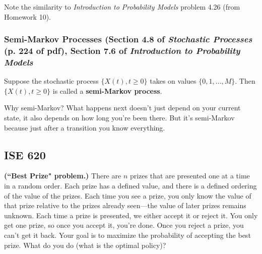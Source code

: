 \begin{example}

Note the similarity to \textit{Introduction to Probability Models} problem 4.26 (from Homework 10).

\end{example}

\subsubsection{Semi-Markov Processes (Section 4.8 of \textit{Stochastic Processes} (p. 224 of pdf), Section 7.6 of \textit{Introduction to Probability Models}}

\begin{definition}Suppose the stochastic process \(\{X(t), t \geq 0\}\) takes on values \(\{0, 1, \ldots, M\}\). Then \(\{X(t), t \geq 0\}\) is called a \textbf{semi-Markov process}. 

\end{definition}

Why semi-Markov? What happens next doesn't just depend on your current state, it also depends on how long you're been there. But it's semi-Markov because just after a transition you know everything.
\subsection{ISE 620}


\begin{exercise} \textbf{(``Best Prize" problem.)} There are \(n\) prizes that are presented one at a time in a random order. Each prize has a defined value, and there is a defined ordering of the value of the prizes. Each time you see a prize, you only know the value of that prize relative to the prizes already seen---the value of later prizes remains unknown. Each time a prize is presented, we either accept it or reject it. You only get one prize, so once you accept it, you're done. Once you reject a prize, you can't get it back. Your goal is to maximize the probability of accepting the best prize. What do you do (what is the optimal policy)?

\end{exercise}

